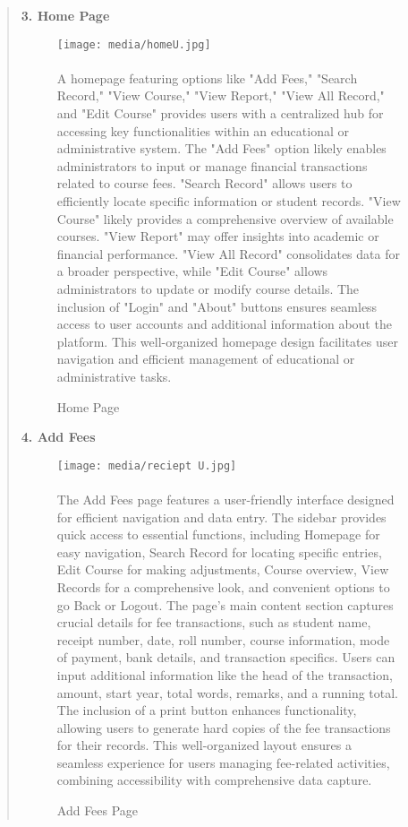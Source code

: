\documentclass[12pt]{report}
\begin{document}
\begin{quote}
		\clearpage
		
		\textbf{3. Home Page}
		\begin{figure}[h]
			\centering
			\texttt{[image: media/homeU.jpg]}\\
			\caption{Home Page}
			\vspace{0.5cm}
			\paragraph{}
			\justifying
			A homepage featuring options like "Add Fees," "Search Record," "View Course," "View Report," "View All Record," and "Edit Course" provides users with a centralized hub for accessing key functionalities within an educational or administrative system. The "Add Fees" option likely enables administrators to input or manage financial transactions related to course fees. "Search Record" allows users to efficiently locate specific information or student records. "View Course" likely provides a comprehensive overview of available courses. "View Report" may offer insights into academic or financial performance. "View All Record" consolidates data for a broader perspective, while "Edit Course" allows administrators to update or modify course details. The inclusion of "Login" and "About" buttons ensures seamless access to user accounts and additional information about the platform. This well-organized homepage design facilitates user navigation and efficient management of educational or administrative tasks.
		\end{figure}
		\clearpage
		
		\textbf{4. Add Fees}
		\begin{figure}[h]
			\centering
			\texttt{[image: media/reciept U.jpg]}\\
			\caption{Add Fees Page}
			\vspace{0.5cm}
			\paragraph{}
			\justifying
			The Add Fees page features a user-friendly interface designed for efficient navigation and data entry. The sidebar provides quick access to essential functions, including Homepage for easy navigation, Search Record for locating specific entries, Edit Course for making adjustments, Course overview, View Records for a comprehensive look, and convenient options to go Back or Logout. The page's main content section captures crucial details for fee transactions, such as student name, receipt number, date, roll number, course information, mode of payment, bank details, and transaction specifics. Users can input additional information like the head of the transaction, amount, start year, total words, remarks, and a running total. The inclusion of a print button enhances functionality, allowing users to generate hard copies of the fee transactions for their records. This well-organized layout ensures a seamless experience for users managing fee-related activities, combining accessibility with comprehensive data capture.
		\end{figure}
		\clearpage
		

\end{quote}
\end{document}
